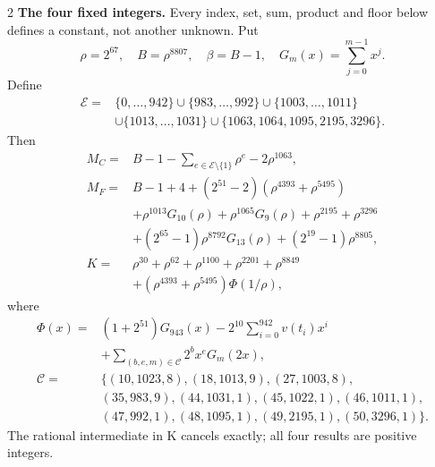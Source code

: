 \documentclass[10pt]{article}
\newcommand{\rg}[2]{\{#1,\ldots,#2\}}
\begin{document}
\begin{multicols}{2}
\textbf{The four fixed integers.}
Every index, set, sum, product and floor below defines a constant, not
another unknown. Put
\[
\rho=2^{67},\quad B=\rho^{8807},\quad\beta=B-1,\quad
G_m(x)=\sum_{j=0}^{m-1}x^j.
\]
Define
\[
\begin{split}
\mathcal E={}&\rg0{942}\cup\rg{983}{992}\cup\rg{1003}{1011}\\
&\cup\rg{1013}{1031}\cup\{1063,1064,1095,2195,3296\}.
\end{split}
\]
Then
\begin{align*}
M_C={}&B-1-\sum_{e\in\mathcal E\setminus\{1\}}\rho^e-2\rho^{1063},\\
M_F={}&B-1+4+(2^{51}-2)(\rho^{4393}+\rho^{5495})\\
&+\rho^{1013}G_{10}(\rho)+\rho^{1065}G_9(\rho)
  +\rho^{2195}+\rho^{3296}\\
&+(2^{65}-1)\rho^{8792}G_{13}(\rho)+(2^{19}-1)\rho^{8805},\\
K={}&\rho^{30}+\rho^{62}+\rho^{1100}+\rho^{2201}+\rho^{8849}\\
&+(\rho^{4393}+\rho^{5495})\Phi(1/\rho),
\end{align*}
where
\[
\begin{split}
\Phi(x)={}&(1+2^{51})G_{943}(x)
 -2^{10}\sum_{i=0}^{942}v(t_i)x^i\\
&+\sum_{(b,e,m)\in\mathcal C}2^b x^e G_m(2x),\\
\mathcal C={}&\{(10,1023,8),(18,1013,9),(27,1003,8),\\
&(35,983,9),(44,1031,1),(45,1022,1),(46,1011,1),\\
&(47,992,1),(48,1095,1),(49,2195,1),(50,3296,1)\}.
\end{split}
\]
The rational intermediate in K cancels exactly; all four results are positive integers.


\end{multicols}
\end{document}
